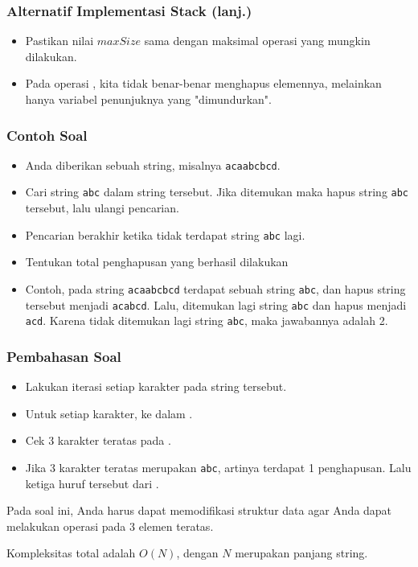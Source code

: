 \begin{frame}
\frametitle{Alternatif Implementasi Stack (lanj.)}
\begin{itemize}
  \item Pastikan nilai $maxSize$ sama dengan maksimal operasi  yang mungkin dilakukan.
  \item Pada operasi , kita tidak benar-benar menghapus elemennya, melainkan hanya variabel penunjuknya yang "dimundurkan".
\end{itemize}
\end{frame}

\frame{\sectionpage}

\begin{frame}
\frametitle{Contoh Soal}

\begin{itemize}
  \item Anda diberikan sebuah string, misalnya \texttt{acaabcbcd}.
  \item Cari string \texttt{abc} dalam string tersebut. Jika ditemukan maka hapus string \texttt{abc} tersebut, lalu ulangi pencarian.
  \item Pencarian berakhir ketika tidak terdapat string \texttt{abc} lagi.
  \item Tentukan total penghapusan yang berhasil dilakukan
  \item Contoh, pada string \texttt{acaabcbcd} terdapat sebuah string \texttt{abc}, dan hapus string tersebut menjadi \texttt{acabcd}. Lalu, ditemukan lagi string \texttt{abc} dan hapus menjadi \texttt{acd}. Karena tidak ditemukan lagi string \texttt{abc}, maka jawabannya adalah 2.
\end{itemize}
\end{frame}

\begin{frame}
\frametitle{Pembahasan Soal}

\begin{itemize}
  \item Lakukan iterasi setiap karakter pada string tersebut.
  \item Untuk setiap karakter,  ke dalam .
  \item Cek 3 karakter teratas pada .
  \item Jika 3 karakter teratas merupakan \texttt{abc}, artinya terdapat 1 penghapusan. Lalu  ketiga huruf tersebut dari .
\end{itemize}
Pada soal ini, Anda harus dapat memodifikasi struktur data  agar Anda dapat melakukan operasi  pada 3 elemen teratas.

Kompleksitas total adalah $O(N)$, dengan $N$ merupakan panjang string.
\end{frame}

